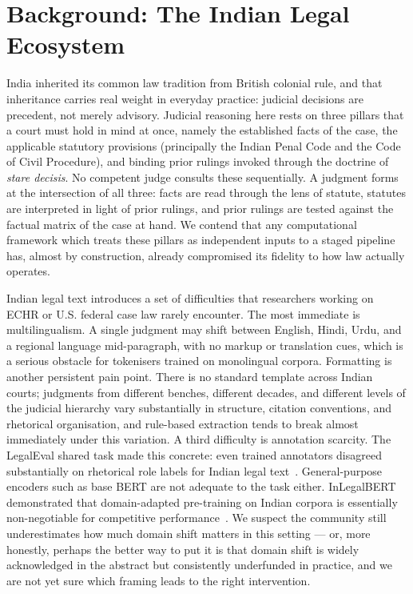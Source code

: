 \section{Background: The Indian Legal Ecosystem}

India inherited its common law tradition from British colonial rule, and that inheritance carries real weight in everyday practice: judicial decisions are precedent, not merely advisory. Judicial reasoning here rests on three pillars that a court must hold in mind at once, namely the established facts of the case, the applicable statutory provisions (principally the Indian Penal Code and the Code of Civil Procedure), and binding prior rulings invoked through the doctrine of \emph{stare decisis}. No competent judge consults these sequentially. A judgment forms at the intersection of all three: facts are read through the lens of statute, statutes are interpreted in light of prior rulings, and prior rulings are tested against the factual matrix of the case at hand. We contend that any computational framework which treats these pillars as independent inputs to a staged pipeline has, almost by construction, already compromised its fidelity to how law actually operates.

 Indian legal text introduces a set of difficulties that researchers working on ECHR or U.S. federal case law rarely encounter. The most immediate is multilingualism. A single judgment may shift between English, Hindi, Urdu, and a regional language mid-paragraph, with no markup or translation cues, which is a serious obstacle for tokenisers trained on monolingual corpora. Formatting is another persistent pain point. There is no standard template across Indian courts; judgments from different benches, different decades, and different levels of the judicial hierarchy vary substantially in structure, citation conventions, and rhetorical organisation, and rule-based extraction tends to break almost immediately under this variation. A third difficulty is annotation scarcity. The LegalEval shared task made this concrete: even trained annotators disagreed substantially on rhetorical role labels for Indian legal text~\cite{modi-etal-2023-semeval}. General-purpose encoders such as base BERT are not adequate to the task either. InLegalBERT demonstrated that domain-adapted pre-training on Indian corpora is essentially non-negotiable for competitive performance~\cite{paul-etal-2023-inlegalbert}. We suspect the community still underestimates how much domain shift matters in this setting — or, more honestly, perhaps the better way to put it is that domain shift is widely acknowledged in the abstract but consistently underfunded in practice, and we are not yet sure which framing leads to the right intervention.

